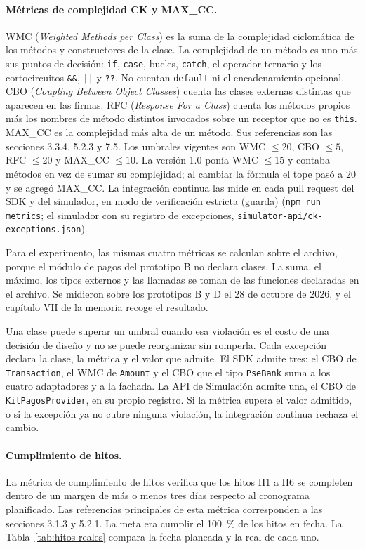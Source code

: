 \paragraph{Métricas de complejidad CK y MAX\_CC.}
WMC (\textit{Weighted Methods per Class}) es la suma de la complejidad ciclomática de los métodos y constructores de la clase. La complejidad de un método es uno más sus puntos de decisión: \texttt{if}, \texttt{case}, bucles, \texttt{catch}, el operador ternario y los cortocircuitos \texttt{\&\&}, \texttt{||} y \texttt{??}. No cuentan \texttt{default} ni el encadenamiento opcional. CBO (\textit{Coupling Between Object Classes}) cuenta las clases externas distintas que aparecen en las firmas. RFC (\textit{Response For a Class}) cuenta los métodos propios más los nombres de método distintos invocados sobre un receptor que no es \texttt{this}. MAX\_CC es la complejidad más alta de un método. Sus referencias son las secciones 3.3.4, 5.2.3 y 7.5. Los umbrales vigentes son WMC $\le 20$, CBO $\le 5$, RFC $\le 20$ y MAX\_CC $\le 10$. La versión 1.0 ponía WMC $\le 15$ y contaba métodos en vez de sumar su complejidad; al cambiar la fórmula el tope pasó a 20 y se agregó MAX\_CC. La integración continua las mide en cada pull request del SDK y del simulador, en modo de verificación estricta (guarda) (\texttt{npm run metrics}; el simulador con su registro de excepciones, \texttt{simulator-api/ck-exceptions.json}).

Para el experimento, las mismas cuatro métricas se calculan sobre el archivo, porque el módulo de pagos del prototipo B no declara clases. La suma, el máximo, los tipos externos y las llamadas se toman de las funciones declaradas en el archivo. Se midieron sobre los prototipos B y D el 28 de octubre de 2026, y el capítulo VII de la memoria recoge el resultado.

Una clase puede superar un umbral cuando esa violación es el costo de una decisión de diseño y no se puede reorganizar sin romperla. Cada excepción declara la clase, la métrica y el valor que admite. El SDK admite tres: el CBO de \texttt{Transaction}, el WMC de \texttt{Amount} y el CBO que el tipo \texttt{PseBank} suma a los cuatro adaptadores y a la fachada. La API de Simulación admite una, el CBO de \texttt{KitPagosProvider}, en su propio registro. Si la métrica supera el valor admitido, o si la excepción ya no cubre ninguna violación, la integración continua rechaza el cambio.

\paragraph{Cumplimiento de hitos.}
La métrica de cumplimiento de hitos verifica que los hitos H1 a H6 se completen dentro de un margen de más o menos tres días respecto al cronograma planificado. Las referencias principales de esta métrica corresponden a las secciones 3.1.3 y 5.2.1. La meta era cumplir el 100~\% de los hitos en fecha. La Tabla~\ref{tab:hitos-reales} compara la fecha planeada y la real de cada uno.

